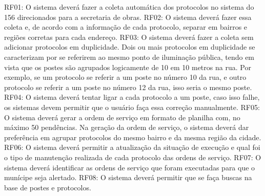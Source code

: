 \documentclass[
	article,			%
	11pt,				%
	oneside,			%
	a4paper,			%
	english,			%
	brazil,				%
	sumario=tradicional
	]{abntex2}
\begin{document}
RF01: O sistema deverá fazer a coleta automática dos protocolos no sistema do 156
direcionados para a secretaria de obras.
RF02: O sistema deverá fazer essa coleta e, de acordo com a informação de cada
protocolo, separar em bairros e regiões corretas para cada endereço.
RF03: O sistema deverá fazer a coleta sem adicionar protocolos em duplicidade.
Dois ou mais protocolos em duplicidade se caracterizam por se referirem ao
mesmo ponto de iluminação pública, tendo em vista que os postes são agrupados
logicamente de 10 em 10 metros na rua. Por exemplo, se um protocolo se referir
a um poste no número 10 da rua, e outro protocolo se referir a um poste no número
12 da rua, isso seria o mesmo poste.
RF04: O sistema deverá tentar ligar a cada protocolo a um poste, caso isso falhe,
os sistemas devem permitir que o usuário faça essa correção manualmente.
RF05: O sistema deverá gerar a ordem de serviço em formato de planilha com,
no máximo 50 pendências. Na geração da ordem de serviço, o sistema deverá
dar preferência em agrupar protocolos do mesmo bairro e da mesma região da cidade.
RF06: O sistema deverá permitir a atualização da situação de execução e qual foi
o tipo de manutenção realizada de cada protocolo das ordens de serviço.
RF07: O sistema deverá identificar as ordens de serviço que foram executadas para
que o munícipe seja alertado.
RF08: O sistema deverá permitir que se faça buscas na base de postes e protocolos.







\end{document}
